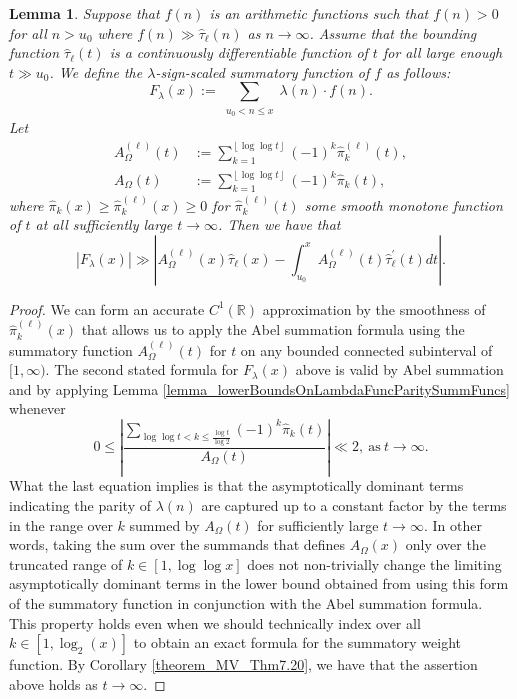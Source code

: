 \documentclass[11pt,reqno,a4letter]{article}
\numberwithin{figure}{section}
\numberwithin{table}{section}
\newcommand{\floor}[1]{\left\lfloor #1 \right\rfloor}
\theoremstyle{plain}
\newtheorem{lemma}[theorem]{Lemma}
\numberwithin{theorem}{section}
\theoremstyle{definition}
\newcommand{\SuccSim}[0]{\overset{_{\scriptsize{\blacktriangle}}}{\succsim}}
\renewcommand{\SuccSim}[0]{\ensuremath{\gg}}
\begin{document}
\begin{lemma} 
\label{lemma_CLT_and_AbelSummation} 
Suppose that $f(n)$ is an arithmetic functions 
such that $f(n) > 0$ for all $n > u_0$ where 
$f(n) \SuccSim \widehat{\tau}_{\ell}(n)$ as $n \rightarrow \infty$. Assume that 
the bounding function $\widehat{\tau}_{\ell}(t)$ is a continuously differentiable function of $t$ for all 
large enough $t \gg u_0$.  
We define the $\lambda$-sign-scaled summatory function of $f$ as follows: 
\[
F_{\lambda}(x) := \sum_{\substack{u_0 < n \leq x}} \lambda(n) \cdot f(n). 
\]
Let 
\begin{align*} 
A_{\Omega}^{(\ell)}(t) & := \sum_{k=1}^{\floor{\log\log t}} (-1)^k \widehat{\pi}_k^{(\ell)}(t), \\ 
A_{\Omega}(t) & := \sum_{k=1}^{\floor{\log\log t}} (-1)^k \widehat{\pi}_k(t), 
\end{align*} 
where $\widehat{\pi}_k(x) \geq \widehat{\pi}_k^{(\ell)}(x) \geq 0$ for 
$\widehat{\pi}_k^{(\ell)}(t)$ some smooth monotone 
function of $t$ at all sufficiently large $t \rightarrow \infty$. 
Then we have that 
\[
|F_{\lambda}(x)| \SuccSim \left\lvert 
     A_{\Omega}^{(\ell)}(x) \widehat{\tau}_{\ell}(x) - 
     \int_{u_0}^{x} A_{\Omega}^{(\ell)}(t) \widehat{\tau}_{\ell}^{\prime}(t) dt 
     \right\rvert.  
\]
\end{lemma}
\begin{proof} 
We can form an accurate $C^{1}(\mathbb{R})$ approximation by the smoothness of 
$\widehat{\pi}_k^{(\ell)}(x)$ that allows us to apply the Abel summation formula using the summatory 
function $A_{\Omega}^{(\ell)}(t)$ for $t$ on any bounded connected subinterval of $[1, \infty)$. 
The second stated formula for $F_{\lambda}(x)$ above is valid by Abel summation and by 
applying Lemma \ref{lemma_lowerBoundsOnLambdaFuncParitySummFuncs} whenever 
\[
0 \leq \left\lvert \frac{\displaystyle\sum\limits_{\log\log t < k \leq \frac{\log t}{\log 2}} 
     (-1)^k \widehat{\pi}_k(t)}{A_{\Omega}(t)}\right\rvert \ll 2, 
     \mathrm{\ as\ } t \rightarrow \infty. 
\]
What the last equation implies is that the asymptotically dominant terms indicating the parity of 
$\lambda(n)$ are captured up to a constant factor 
by the terms in the range over $k$ summed by $A_{\Omega}(t)$ for 
sufficiently large $t \rightarrow \infty$. 
In other words, taking the sum over the summands that defines $A_{\Omega}(x)$ only over the truncated range of 
$k \in [1, \log\log x]$ does not non-trivially change the limiting asymptotically 
dominant terms in the lower bound obtained from using this form of the summatory function in 
conjunction with the Abel summation formula. 
This property holds even when we should technically 
index over all $k \in [1, \log_2(x)]$ to obtain an exact formula for the summatory weight function.  
By Corollary \ref{theorem_MV_Thm7.20}, we have that 
the assertion above holds as $t \rightarrow \infty$. 
\end{proof} 
\end{document}
